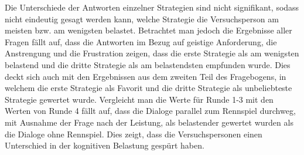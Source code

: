\documentclass[12pt,a4paper]{scrartcl}
\begin{document}
Die Unterschiede der Antworten einzelner Strategien sind nicht signifikant, sodass nicht eindeutig gesagt werden kann, welche Strategie die Versuchsperson am meisten bzw. am wenigsten belastet. Betrachtet man jedoch die Ergebnisse aller Fragen fällt auf, dass die Antworten im Bezug auf geistige Anforderung, die Anstrengung und die Frustration zeigen, dass die erste Strategie als am wenigsten belastend und die dritte Strategie als am belastendsten empfunden wurde. Dies deckt sich auch mit den Ergebnissen aus dem zweiten Teil des Fragebogens, in welchem die erste Strategie als Favorit und die dritte Strategie als unbeliebteste Strategie gewertet wurde. \newline \newline Vergleicht man die Werte für Runde 1-3 mit den Werten von Runde 4 fällt auf, dass die Dialoge parallel zum Rennspiel durchweg, mit Ausnahme der Frage nach der Leistung, als belastender gewertet wurden als die Dialoge ohne Rennspiel. Dies zeigt, dass die Versuchspersonen einen Unterschied in der kognitiven Belastung gespürt haben.   
\end{document}
